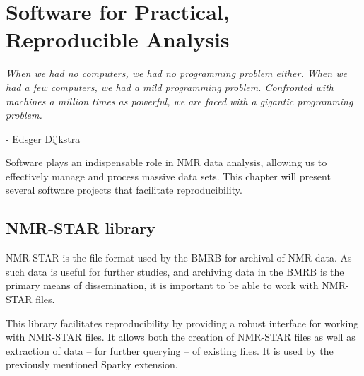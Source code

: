 \chapter{Software for Practical, Reproducible Analysis}

\begin{center}
  \textit{When we had no computers, we had no programming problem either. 
    When we had a few computers, we had a mild programming problem. Confronted 
    with machines a million times as powerful, we are faced with a gigantic 
    programming problem.}

 - Edsger Dijkstra
\end{center}

Software plays an indispensable role in NMR data analysis, allowing us
to effectively manage and process massive data sets.  This chapter will
present several software projects that facilitate reproducibility.

\section{NMR-STAR library}
NMR-STAR is the file format used by the BMRB \cite{bmrb} for archival of
NMR data.  As such data is useful for further studies, and archiving
data in the BMRB is the primary means of dissemination, it is important
to be able to work with NMR-STAR files.

This library facilitates reproducibility by providing a robust interface
for working with NMR-STAR files.  It allows both the creation of NMR-STAR 
files as well as extraction of data -- for further querying -- of existing
files.  It is used by the previously mentioned Sparky extension.

